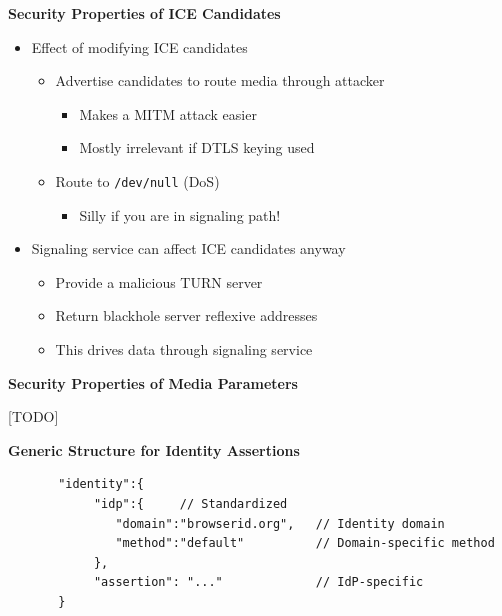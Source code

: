 \documentclass[helvetica]{seminar}
\newcommand{\heading}[1]{%
  \begin{center} 
    \large\bf 
    #1 
  \end{center} 
  \vspace{.4 in}}
\begin{document}
\begin{slide}
\heading{Security Properties of ICE Candidates}

\begin{itemize}
\item Effect of modifying ICE candidates
  \begin{itemize}
  \item Advertise candidates to route media through attacker
    \begin{itemize}
    \item Makes a MITM attack easier
    \item Mostly irrelevant if DTLS keying used
    \end{itemize}
  \item Route to \verb^/dev/null^ (DoS)
    \begin{itemize}
    \item Silly if you are in signaling path!
    \end{itemize}

  \end{itemize}

\item Signaling service can affect ICE candidates anyway
  \begin{itemize}
  \item Provide a malicious TURN server
  \item Return blackhole server reflexive addresses
  \item This drives data through signaling service
  \end{itemize}
\end{itemize}
\end{slide}



\begin{slide}
\heading{Security Properties of Media Parameters}

[TODO]

\end{slide}



\begin{slide}
\heading{Generic Structure for Identity Assertions}

\begin{small}
\begin{verbatim}
       "identity":{
            "idp":{     // Standardized
               "domain":"browserid.org",   // Identity domain
               "method":"default"          // Domain-specific method
            },
            "assertion": "..."             // IdP-specific
       }
\end{verbatim}
\end{small}
\end{slide}
\end{document}
